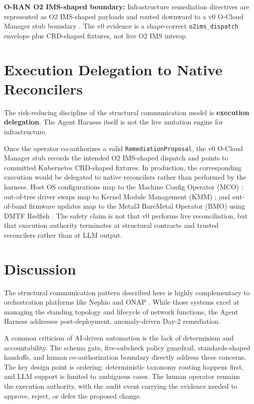 \documentclass[twocolumn,10pt,a4paper]{article}
\begin{document}
\textbf{O-RAN O2 IMS-shaped boundary:} Infrastructure remediation directives are represented as O2 IMS-shaped payloads and routed downward to a v0 O-Cloud Manager stub boundary \cite{oran_o2_ims, oran_o2ims_ocm}. The v0 evidence is a shape-correct \texttt{o2ims\_dispatch} envelope plus CRD-shaped fixtures, not live O2 IMS interop.

\section{Execution Delegation to Native Reconcilers}
\label{sec:delegation}

The risk-reducing discipline of the structural communication model is \textbf{execution delegation}. The Agent Harness itself is not the live mutation engine for infrastructure.

Once the operator co-authorizes a valid \texttt{RemediationProposal}, the v0 O-Cloud Manager stub records the intended O2 IMS-shaped dispatch and points to committed Kubernetes CRD-shaped fixtures. In production, the corresponding execution would be delegated to native reconcilers rather than performed by the harness. Host OS configurations map to the Machine Config Operator (MCO) \cite{openshift_mco}; out-of-tree driver swaps map to Kernel Module Management (KMM) \cite{kmm_operator}; and out-of-band firmware updates map to the Metal3 BareMetal Operator (BMO) using DMTF Redfish \cite{metal3_bmo, dmtf_redfish}. The safety claim is not that v0 performs live reconciliation, but that execution authority terminates at structural contracts and trusted reconcilers rather than at LLM output.

\section{Discussion}
\label{sec:discuss}

The structural communication pattern described here is highly complementary to orchestration platforms like Nephio \cite{nephio} and ONAP \cite{onap}. While those systems excel at managing the standing topology and lifecycle of network functions, the Agent Harness addresses post-deployment, anomaly-driven Day-2 remediation.

A common criticism of AI-driven automation is the lack of determinism and accountability. The schema gate, five-subcheck policy guardrail, standards-shaped handoffs, and human co-authorization boundary directly address these concerns. The key design point is ordering: deterministic taxonomy routing happens first, and LLM support is limited to ambiguous cases. The human operator remains the execution authority, with the audit event carrying the evidence needed to approve, reject, or defer the proposed change.
\end{document}
